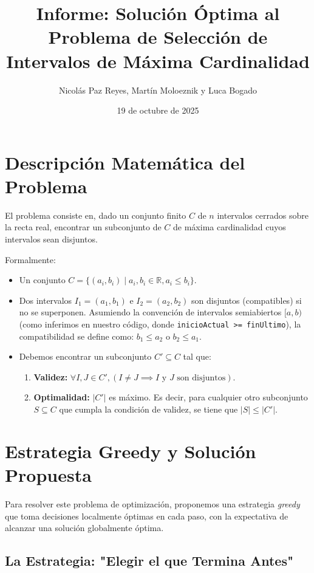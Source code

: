 \documentclass[12pt, a4paper]{article}
\title{Informe: Solución Óptima al Problema de Selección de Intervalos de Máxima Cardinalidad}
\author{Nicolás Paz Reyes, Martín Moloeznik y Luca Bogado}
\date{19 de octubre de 2025}
\begin{document}
\maketitle

\section{Descripción Matemática del Problema}

El problema consiste en, dado un conjunto finito $C$ de $n$ intervalos cerrados sobre la recta real, 
encontrar un subconjunto de $C$ de máxima cardinalidad cuyos intervalos sean disjuntos.

Formalmente:

\begin{itemize}
    \item Un conjunto $C = \{(a_i, b_i) \mid a_i, b_i \in \mathbb{R}, a_i \le b_i\}$.
    
    \item Dos intervalos $I_1 = (a_1, b_1)$ e $I_2 = (a_2, b_2)$ son disjuntos (compatibles) si no se superponen. Asumiendo la convención de intervalos semiabiertos $[a, b)$ (como inferimos en nuestro código, donde \texttt{inicioActual >= finUltimo}), la compatibilidad se define como:
    $b_1 \le a_2$ o $b_2 \le a_1$.
    
    \item Debemos encontrar un subconjunto $C' \subseteq C$ tal que:
    \begin{enumerate}
        \item \textbf{Validez:} $\forall I, J \in C', (I \neq J \implies I \text{ y } J \text{ son disjuntos})$.
        \item \textbf{Optimalidad:} $|C'|$ es máximo. Es decir, para cualquier otro subconjunto $S \subseteq C$ que cumpla la condición de validez, se tiene que $|S| \le |C'|$.
    \end{enumerate}
\end{itemize}

\section{Estrategia Greedy y Solución Propuesta}

Para resolver este problema de optimización, proponemos una estrategia \textit{greedy} 
que toma decisiones localmente óptimas en cada paso, con la expectativa de alcanzar una solución 
globalmente óptima.

\subsection*{La Estrategia: "Elegir el que Termina Antes"}
\end{document}
